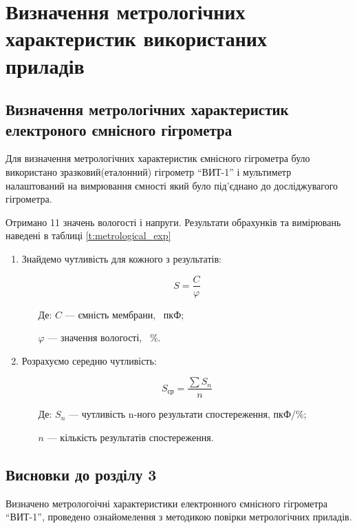 \chapter{Визначення метрологічних характеристик використаних приладів}
\section{Визначення метрологічних характеристик електроного ємнісного гігрометра}

Для визначення метрологічних характеристик ємнісного гігрометра було використано
зразковий(еталонний) гігрометр ``ВИТ-1'' і мультиметр налаштований на вимрювання ємності який було
під’єднано до досліджувагого гігрометра.

Отримано 11 значень вологості і напруги. Результати обрахунків та вимірювань наведені в таблиці \ref{t:metrological_exp}



\begin{enumerate}[leftmargin=*]
    \item Знайдемо чутливість для кожного з результатів:

    \begin{equation}
        S = \frac{C}{\varphi}
    \end{equation}

    \begin{itemize}
        \item [Де:] $C$ --- ємність мембрани, ~пкФ;
        \item []$\varphi$ ---  значення вологості, ~\%.
    \end{itemize}

    

    \item Розрахуємо середню чутливість:

    \begin{equation}
    S_{\text{ср}} = \frac{\sum S_n}{n}
    \end{equation}

    \begin{itemize}
        \item [Де:] $S_n$ --- чутливість n-ного результати спостереження, пкФ/\%;
        \item []$n$ ---  кількість результатів спостереження.
    \end{itemize}

    
\end{enumerate}

\section*{Висновки до розділу 3}

Визначено метрологоічні характеристики електронного ємнісного гігрометра ``ВИТ-1'', проведено
ознайомелення з методикою повірки метрологічних приладів.
